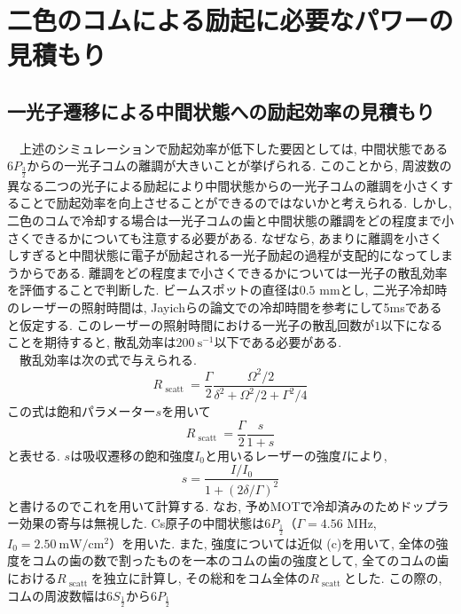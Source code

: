 \documentclass[uplatex, dvipdfmx, a4paper, report, papersize, 11pt]{jsbook}
\begin{document}
\section{二色のコムによる励起に必要なパワーの見積もり}
\subsection{一光子遷移による中間状態への励起効率の見積もり}
　上述のシミュレーションで励起効率が低下した要因としては, 中間状態である$6P_{\frac{3}{2}}$からの一光子コムの離調が大きいことが挙げられる. このことから, 周波数の異なる二つの光子による励起により中間状態からの一光子コムの離調を小さくすることで励起効率を向上させることができるのではないかと考えられる. しかし, 二色のコムで冷却する場合は一光子コムの歯と中間状態の離調をどの程度まで小さくできるかについても注意する必要がある. なぜなら, あまりに離調を小さくしすぎると中間状態に電子が励起される一光子励起の過程が支配的になってしまうからである. 離調をどの程度まで小さくできるかについては一光子の散乱効率を評価することで判断した. ビームスポットの直径は$0.5$ mmとし, 二光子冷却時のレーザーの照射時間は, Jayichらの論文での冷却時間を参考にして5msであると仮定する. このレーザーの照射時間における一光子の散乱回数が$1$以下になることを期待すると, 散乱効率は$200\ \mathrm{s^{-1}}$以下である必要がある. \\
　散乱効率は次の式で与えられる.
\begin{equation}
  R _ { \text { scatt } } = \frac { \Gamma } { 2 } \frac { \Omega ^ { 2 } / 2 } { \delta ^ { 2 } + \Omega ^ { 2 } / 2 + \Gamma ^ { 2 } / 4 }
\end{equation}
この式は飽和パラメーター$s$を用いて
\begin{equation}
  R _ { \text { scatt } } = \frac { \Gamma } { 2 } \frac{s}{1+s}
\end{equation}
と表せる. $s$は吸収遷移の飽和強度$I_0$と用いるレーザーの強度$I$により,
\begin{equation}
  s = \frac{I/I_0}{1+(2\delta/\Gamma)^2}
\end{equation}
と書けるのでこれを用いて計算する\cite{ノーベル賞と分光学}. なお, 予めMOTで冷却済みのためドップラー効果の寄与は無視した. Cs原子の中間状態は$6P_{\frac{1}{2}}$（$\Gamma = 4.56$ MHz,\ $I_0 = 2.50 \mathrm{\ mW/cm^2}$）を用いた\cite{CsDLine}. また, 強度については近似 (c)を用いて, 全体の強度をコムの歯の数で割ったものを一本のコムの歯の強度として, 全てのコムの歯における$R _ { \text { scatt } }$を独立に計算し, その総和をコム全体の$R _ { \text { scatt } }$とした. この際の, コムの周波数幅は$6S_{\frac{1}{2}}$から$6P_{\frac{1}{2}}$
\end{document}
